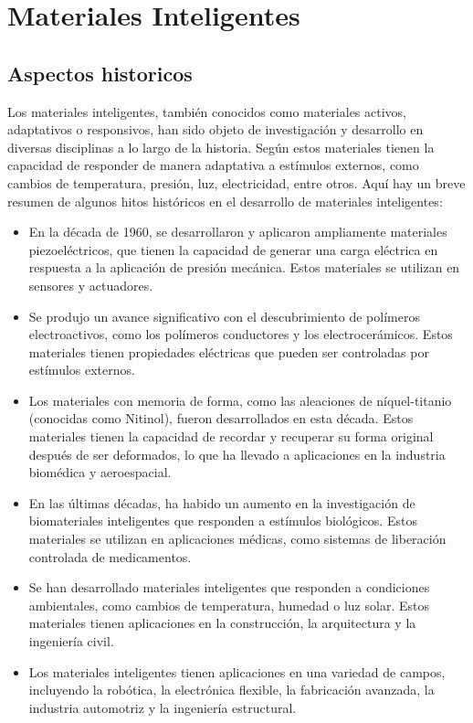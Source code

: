 \section{Materiales Inteligentes}
\subsection{Aspectos historicos}
Los materiales inteligentes, también conocidos como materiales activos, adaptativos o responsivos, han sido objeto de investigación y desarrollo en diversas disciplinas a lo largo de la historia. Según \cite{materiales} estos materiales tienen la capacidad de responder de manera adaptativa a estímulos externos, como cambios de temperatura, presión, luz, electricidad, entre otros. Aquí hay un breve resumen de algunos hitos históricos en el desarrollo de materiales inteligentes:
    \begin{itemize}
        \item En la década de 1960, se desarrollaron y aplicaron ampliamente materiales piezoeléctricos, que tienen la capacidad de generar una carga eléctrica en respuesta a la aplicación de presión mecánica. Estos materiales se utilizan en sensores y actuadores.
        \item Se produjo un avance significativo con el descubrimiento de polímeros electroactivos, como los polímeros conductores y los electrocerámicos. Estos materiales tienen propiedades eléctricas que pueden ser controladas por estímulos externos.
        \item Los materiales con memoria de forma, como las aleaciones de níquel-titanio (conocidas como Nitinol), fueron desarrollados en esta década. Estos materiales tienen la capacidad de recordar y recuperar su forma original después de ser deformados, lo que ha llevado a aplicaciones en la industria biomédica y aeroespacial.
        \item En las últimas décadas, ha habido un aumento en la investigación de biomateriales inteligentes que responden a estímulos biológicos. Estos materiales se utilizan en aplicaciones médicas, como sistemas de liberación controlada de medicamentos.
        \item Se han desarrollado materiales inteligentes que responden a condiciones ambientales, como cambios de temperatura, humedad o luz solar. Estos materiales tienen aplicaciones en la construcción, la arquitectura y la ingeniería civil.
        \item Los materiales inteligentes tienen aplicaciones en una variedad de campos, incluyendo la robótica, la electrónica flexible, la fabricación avanzada, la industria automotriz y la ingeniería estructural.
    \end{itemize}
